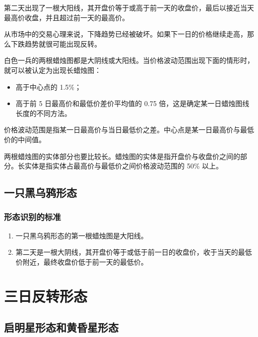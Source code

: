 第二天出现了一根大阳线，其开盘价等于或高于前一天的收盘价，最后以接近当天最高价收盘，并且超过前一天的最高价。

从市场中的交易心理来说，下降趋势已经被破坏。如果下一日的价格继续走高，那么下跌趋势就很可能出现反转。

白色一兵的两根蜡烛图都是大阴线或大阳线。当价格波动范围出现下面的情形时，就可以被认定为出现长蜡烛图：
\begin{itemize}
    \item 高于中心点的 1.5\%；
    \item 高于前 5 日最高价和最低价差价平均值的 0.75 倍，这是确定某一日蜡烛图线长度的不同方法。
\end{itemize}
价格波动范围是指某一日最高价与当日最低价之差。中心点是某一日最高价与最低价的中间值。

两根蜡烛图的实体部分也要比较长。蜡烛图的实体是指开盘价与收盘价之间的部分。长实体是指实体占最高价与最低价之间价格波动范围的 50\% 以上。
\subsection{一只黑乌鸦形态}
\subsubsection*{形态识别的标准}
\begin{enumerate}
    \item 一只黑乌鸦形态的第一根蜡烛图是大阳线。
    \item 第二天是一根大阴线，其开盘价等于或低于前一日的收盘价，收于当天的最低价附近，最终收盘价低于前一天的最低价。
\end{enumerate}
\section{三日反转形态}
\subsection{启明星形态和黄昏星形态}
\section{}